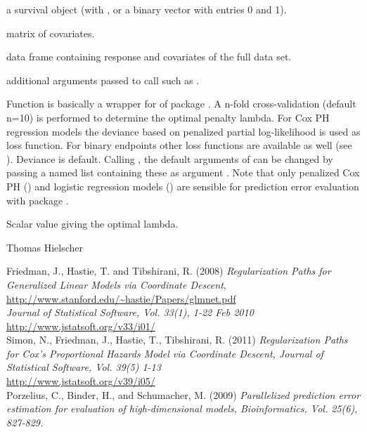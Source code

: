 \documentclass[letterpaper]{book}
\begin{document}
%
\begin{Arguments}
\begin{ldescription}
\item[\code{response}] a survival object (with , or a binary vector with entries 0 and 1).
\item[\code{x}]  matrix of covariates.
\item[\code{full.data}] data frame containing response and covariates of the full data set.
\item[\code{...}] additional arguments passed to  call such as .

\end{ldescription}
\end{Arguments}
%
\begin{Details}\relax
Function is basically a wrapper for  of package . A n-fold cross-validation (default n=10) is performed to determine the optimal penalty lambda.
For Cox PH regression models the deviance based on penalized partial log-likelihood is used as loss function. For binary endpoints other loss functions are available as well (see ). Deviance is default. Calling , the default arguments of  can be changed by passing a named list containing these as argument .
Note that only penalized Cox PH () and logistic regression models () are sensible for prediction error
evaluation with package .
\end{Details}
%
\begin{Value}
Scalar value giving the optimal lambda.
\end{Value}
%
\begin{Author}\relax
Thomas Hielscher \bsl{}
\end{Author}
%
\begin{References}\relax
Friedman, J., Hastie, T. and Tibshirani, R. (2008)
\emph{Regularization Paths for Generalized Linear Models via Coordinate
Descent},   \url{http://www.stanford.edu/~hastie/Papers/glmnet.pdf}\\{}
\emph{Journal of Statistical Software, Vol. 33(1), 1-22 Feb 2010}\\{}
\url{http://www.jstatsoft.org/v33/i01/}\\{}
Simon, N., Friedman, J., Hastie, T., Tibshirani, R. (2011)
\emph{Regularization Paths for Cox's Proportional Hazards Model via
Coordinate Descent, Journal of Statistical Software, Vol. 39(5)
1-13}\\{}
\url{http://www.jstatsoft.org/v39/i05/}\\{}
Porzelius, C., Binder, H., and Schumacher, M. (2009) 
\emph{Parallelized prediction error estimation for evaluation of high-dimensional models,
Bioinformatics, Vol. 25(6), 827-829.}
\end{References}
\end{document}
